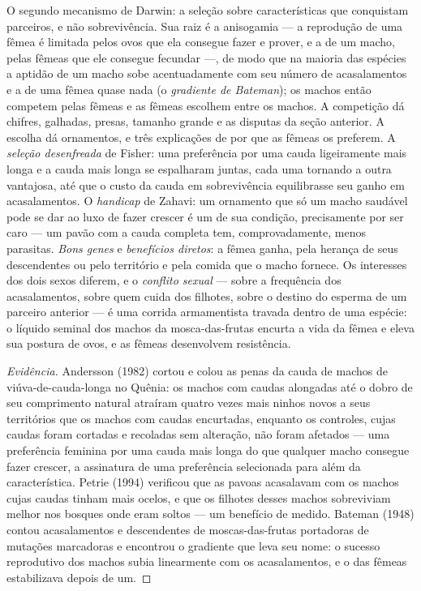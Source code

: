 \begin{definition}\label{def:b3:behavioural-ecology:sexual-selection}
O segundo mecanismo de Darwin: a seleção sobre características que
conquistam parceiros, e não sobrevivência. Sua raiz é a anisogamia --- a
reprodução de uma fêmea é limitada pelos ovos que ela consegue fazer e
prover, e a de um macho, pelas fêmeas que ele consegue fecundar ---, de
modo que na maioria das espécies a aptidão de um macho sobe
acentuadamente com seu número de acasalamentos e a de uma fêmea quase
nada (o \emph{gradiente de Bateman}); os machos então competem pelas
fêmeas e as fêmeas escolhem entre os machos. A competição dá chifres,
galhadas, presas, tamanho grande e as disputas da seção anterior. A
escolha dá ornamentos, e três explicações de por que as fêmeas os
preferem. A \emph{seleção desenfreada} de Fisher: uma preferência por
uma cauda ligeiramente mais longa e a cauda mais longa se espalharam
juntas, cada uma tornando a outra vantajosa, até que o custo da cauda em
sobrevivência equilibrasse seu ganho em acasalamentos. O \emph{handicap}
de Zahavi: um ornamento que só um macho saudável pode se dar ao luxo de
fazer crescer é um  de sua condição, precisamente por ser
caro --- um pavão com a cauda completa tem, comprovadamente, menos
parasitas. \emph{Bons genes} e \emph{benefícios diretos}: a fêmea ganha,
pela herança de seus descendentes ou pelo território e pela comida que o
macho fornece. Os interesses dos dois sexos diferem, e o \emph{conflito
sexual} --- sobre a frequência dos acasalamentos, sobre quem cuida dos
filhotes, sobre o destino do esperma de um parceiro anterior --- é uma
corrida armamentista travada dentro de uma espécie: o líquido seminal
dos machos da mosca-das-frutas encurta a vida da fêmea e eleva sua
postura de ovos, e as fêmeas desenvolvem resistência.
\end{definition}

\begin{proof}[Evidência]
Andersson (1982) cortou e colou as penas da cauda de machos de
viúva-de-cauda-longa no Quênia: os machos com caudas alongadas até o
dobro de seu comprimento natural atraíram quatro vezes mais ninhos novos
a seus territórios que os machos com caudas encurtadas, enquanto os
controles, cujas caudas foram cortadas e recoladas sem alteração, não
foram afetados --- uma preferência feminina por uma cauda mais longa do
que qualquer macho consegue fazer crescer, a assinatura de uma
preferência selecionada para além da característica. Petrie (1994)
verificou que as pavoas acasalavam com os machos cujas caudas tinham mais
ocelos, e que os filhotes desses machos sobreviviam melhor nos bosques
onde eram soltos --- um benefício de  medido. Bateman (1948)
contou acasalamentos e descendentes de moscas-das-frutas portadoras de
mutações marcadoras e encontrou o gradiente que leva seu nome: o sucesso
reprodutivo dos machos subia linearmente com os acasalamentos, e o das
fêmeas estabilizava depois de um.
\end{proof}

